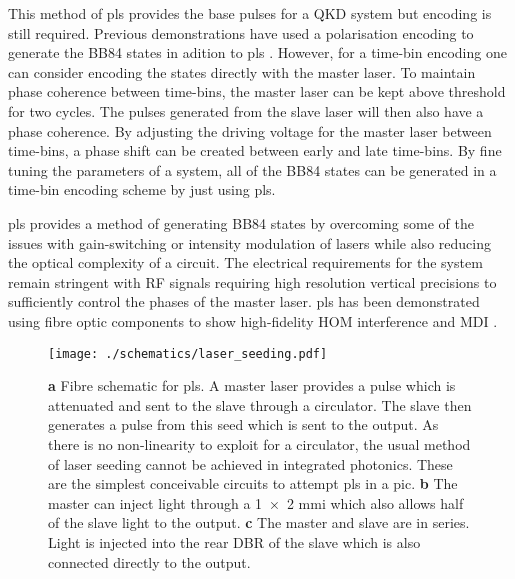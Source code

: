 This method of \ac{pls} provides the base pulses for a \ac{QKD} system but encoding is still required. Previous demonstrations have used a polarisation encoding to generate the BB84 states in adition to \ac{pls} \cite{Comandar2016}. However, for a time-bin encoding one can consider encoding the states directly with the master laser. To maintain phase coherence between time-bins, the master laser can be kept above threshold for two cycles. The pulses generated from the slave laser will then also have a phase coherence. By adjusting the driving voltage for the master laser between time-bins, a phase shift can be created between early and late time-bins. By fine tuning the parameters of a system, all of the BB84 states can be generated in a time-bin encoding scheme by just using \ac{pls}.

\Ac{pls} provides a method of generating BB84 states by overcoming some of the issues with gain-switching or intensity modulation of lasers while also reducing the optical complexity of a circuit. The electrical requirements for the system remain stringent with RF signals requiring high resolution vertical precisions to sufficiently control the phases of the master laser. \Ac{pls} has been demonstrated using fibre optic components to show high-fidelity \ac{HOM} interference and \ac{MDI} \cite{Comandar2016PLS, Comandar2016}. 


\begin{figure}[t]
	\centering
	\texttt{[image: ./schematics/laser\_seeding.pdf]}
	\caption[Schematic of fibre-based and on-chip PLS]{\textbf{a} Fibre schematic for \acf{pls}. A master laser provides a pulse which is attenuated and sent to the slave through a circulator. The slave then generates a pulse from this seed which is sent to the output. As there is no non-linearity to exploit for a circulator, the usual method of laser seeding cannot be achieved in integrated photonics. These are the simplest conceivable circuits to attempt \acs{pls} in a \acs{pic}. \textbf{b} The master can inject light through a \num{1x2} \acs{mmi} which also allows half of the slave light to the output. \textbf{c} The master and slave are in series. Light is injected into the rear \acs{DBR} of the slave which is also connected directly to the output.}
	\label{fig:las_seed_schem}
\end{figure}

